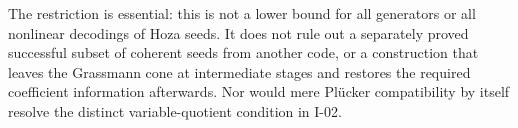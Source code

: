 The restriction is essential: this is not a lower bound for
all generators or all nonlinear decodings of Hoza seeds.
It does not rule out a separately proved successful subset
of coherent seeds from another code, or a construction that
leaves the Grassmann cone at intermediate stages and restores
the required coefficient information afterwards.  Nor would
mere Pl\"ucker compatibility by itself resolve the distinct
variable-quotient condition in I-02.
